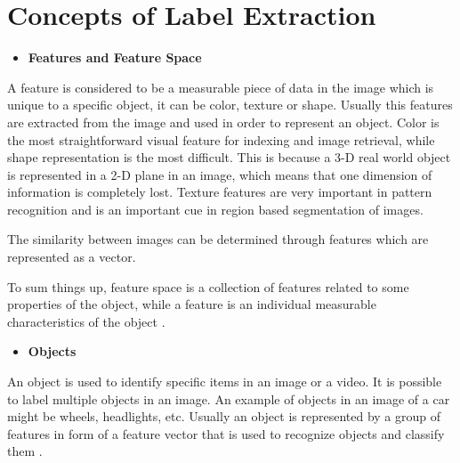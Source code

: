 \newpage

    
\section{Concepts of Label Extraction}
\label{sec:fundamental}




\begin{itemize}
    \item \textbf{Features and Feature Space}
\end{itemize}

    \label{sec:featurespace}
    \par A feature is considered to be a measurable piece of data in the image which is unique to a specific object, it can be color, texture or shape. Usually this features are extracted from the image and used in order to represent an object. Color is the most straightforward visual feature for indexing and image retrieval, while shape representation is the most difficult. This is because a 3-D real world object is represented in a 2-D plane in an image, which means that one dimension of information is completely lost. Texture features are very important in pattern recognition and is an important cue in region based segmentation of images.

    \par The similarity between images can be determined through features which are represented as a vector. 

    \par To sum things up, feature space is a collection of features related to some properties of the object, while a feature is an individual measurable characteristics of the object \cite{Tiwari2013}.

    \begin{itemize}
        \item \textbf{Objects}
    \end{itemize}

 
    \par An object is used to identify specific items in an image or a video. It is possible to label multiple objects in an image. An example of objects in an image of a car might be wheels, headlights, etc. Usually an object is represented by a group of features in form of a feature vector that is used to recognize objects and classify them \cite{Tiwari2013}.

